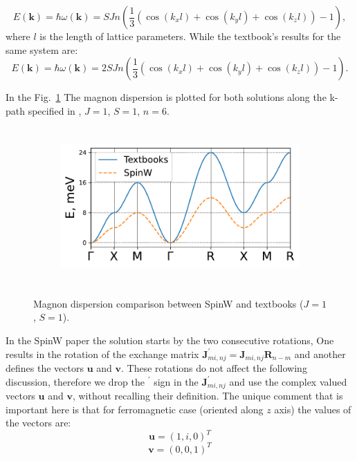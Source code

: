 \documentclass[a4paper,12pt]{article}
\begin{document}
        \begin{equation}
            E(\boldsymbol{k}) = \hbar\omega(\boldsymbol{k}) = SJn\left(\dfrac{1}{3}\left(\cos(k_xl) + \cos(k_yl) + \cos(k_zl)\right) - 1\right),
        \end{equation}
        where $l$ is the length of lattice parameters. While the textbook's results for the same system are:
        \begin{equation}
            E(\boldsymbol{k}) = \hbar\omega(\boldsymbol{k}) = 2SJn\left(\dfrac{1}{3}\left(\cos(k_xl) + \cos(k_yl) + \cos(k_zl)\right) - 1\right). \label{eq:textbook}
        \end{equation}

        In the Fig.~\ref{fig:dispersion-comparasion} The magnon dispersion is plotted for both solutions along the k-path specified in \cite{setyawan2010high}, $J = 1$, $S = 1$, $n = 6$.

        \begin{figure}[H]
            \centering
            \begin{subfigure}[b]{0.8\textwidth}
                \centering
                \includegraphics[height=6cm]{main_dispersion.pdf}
            \end{subfigure}
            \hfill
            \caption{Magnon dispersion comparison between SpinW and textbooks ($J = 1$, $S = 1$).}
            \label{fig:dispersion-comparasion}
        \end{figure}

        In the SpinW paper \cite{toth2015linear} the solution starts by the two consecutive rotations, 
        One results in the rotation of the exchange matrix $\boldsymbol{J}^{\prime}_{mi, nj} = \boldsymbol{J}_{mi, nj}\boldsymbol{R}_{n-m}$ 
        and another defines the vectors $\boldsymbol{u}$ and $\boldsymbol{v}$.
        These rotations do not affect the following discussion, therefore we drop the $^{\prime}$ sign in the $\boldsymbol{J}^{\prime}_{mi, nj}$ 
        and use the complex valued vectors $\boldsymbol{u}$ and $\boldsymbol{v}$, without recalling their definition. 
        The unique comment that is important here is that for ferromagnetic case (oriented along $z$ axis) the values of the vectors are:
        \begin{equation}
            \boldsymbol{u} = (1, i, 0)^T
        \end{equation}
        \begin{equation}
            \boldsymbol{v} = (0, 0, 1)^T
        \end{equation}
\end{document}
